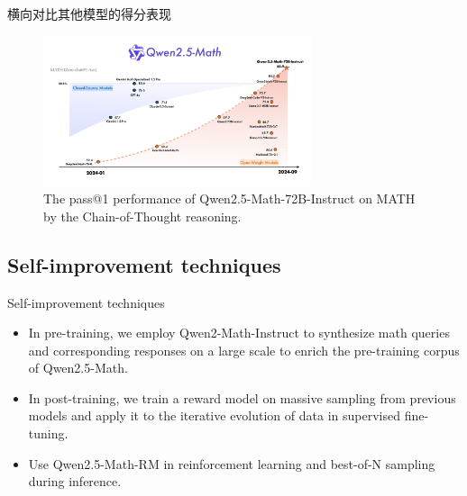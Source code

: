 \documentclass[aspectratio=169]{beamer}
\begin{document}
\begin{frame}{横向对比其他模型的得分表现}
    \begin{figure}[htbp]
        \centering
        \includegraphics[width=0.7\textwidth]{pic/flagship.png}
        \caption{The pass@1 performance of Qwen2.5-Math-72B-Instruct on MATH by the Chain-of-Thought reasoning.}
        \label{fig:intro}
    \end{figure}
\end{frame}

\subsection{Self-improvement techniques}
\begin{frame}{Self-improvement techniques}
    \begin{itemize}
        \item In pre-training, we employ Qwen2-Math-Instruct to synthesize math queries and corresponding responses on a large scale to enrich the pre-training corpus of Qwen2.5-Math.\\[0.2cm]
        \pause
        \item In post-training, we train a reward model on massive sampling from previous models and apply it to the iterative evolution of data in supervised fine-tuning.\\[0.2cm]
        \pause
        \item Use Qwen2.5-Math-RM in reinforcement learning and best-of-N sampling during inference.
    \end{itemize}

\end{frame}
\end{document}
